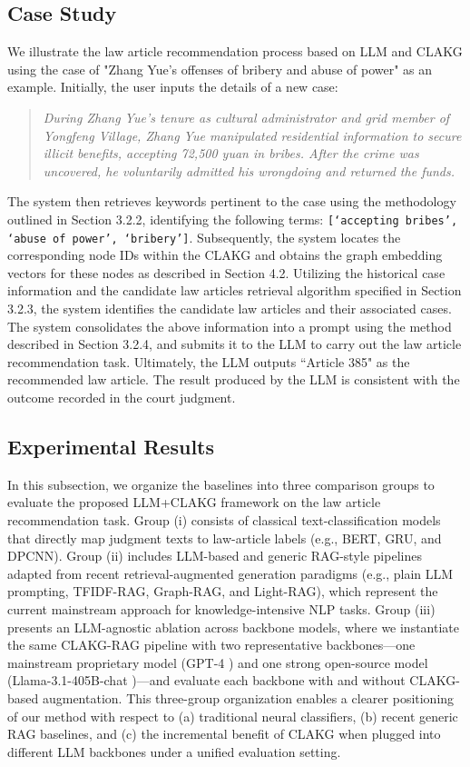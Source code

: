 \documentclass[review,times,nonatbib]{elsarticle} %
\renewcommand{\textcolor}[2]{#2}
\begin{document}
\subsection{Case Study}
We illustrate the law article recommendation process based on LLM and CLAKG using the case of "Zhang Yue's offenses of bribery and abuse of power" as an example. Initially, the user inputs the details of a new case:
\begin{quote}
\textit{During Zhang Yue's tenure as cultural administrator and grid member of Yongfeng Village, Zhang Yue manipulated residential information to secure illicit benefits, accepting 72,500 yuan in bribes. After the crime was uncovered, he voluntarily admitted his wrongdoing and returned the funds.}
\end{quote}
The system then retrieves keywords pertinent to the case using the methodology outlined in Section 3.2.2, identifying the following terms: \texttt{[`accepting bribes', `abuse of power', `bribery']}. Subsequently, the system locates the corresponding node IDs within the CLAKG and obtains the graph embedding vectors for these nodes as described in Section 4.2. Utilizing the historical case information and the candidate law articles retrieval algorithm specified in Section 3.2.3, the system identifies the candidate law articles and their associated cases.\\
The system consolidates the above information into a prompt using the method described in Section 3.2.4, and submits it to the LLM to carry out the law article recommendation task. Ultimately, the LLM outputs ``Article 385" as the recommended law article. The result produced by the LLM is consistent with the outcome recorded in the court judgment.




\subsection{Experimental Results}
\textcolor{blue}{In this subsection, we organize the baselines into three comparison groups to evaluate the proposed LLM+CLAKG framework on the law article recommendation task. Group (i) consists of classical text-classification models that directly map judgment texts to law-article labels (e.g., BERT, GRU, and DPCNN). Group (ii) includes LLM-based and generic RAG-style pipelines adapted from recent retrieval-augmented generation paradigms (e.g., plain LLM prompting, TFIDF-RAG, Graph-RAG, and Light-RAG), which represent the current mainstream approach for knowledge-intensive NLP tasks. Group (iii) presents an LLM-agnostic ablation across backbone models, where we instantiate the same CLAKG-RAG pipeline with two representative backbones—one mainstream proprietary model (GPT-4 \cite{openai2023chatgpt}) and one strong open-source model (Llama-3.1-405B-chat \cite{grattafiori2024llama3herd})—and evaluate each backbone with and without CLAKG-based augmentation. This three-group organization enables a clearer positioning of our method with respect to (a) traditional neural classifiers, (b) recent generic RAG baselines, and (c) the incremental benefit of CLAKG when plugged into different LLM backbones under a unified evaluation setting.}
\end{document}
